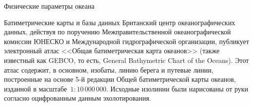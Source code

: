 \begin{chapter}{Физические параметры океана}
\begin{section}{Батиметрические карты и базы данных}
Британский центр океанографических данных, 
действуя по поручению Межправительственной океанографической комиссии ЮНЕСКО
и Международной гидрографической организации,
публикует электронный атлас <<Общая батиметрическая карта океанов>> 
(также известный как GEBCO, то есть, General Bathymetric Chart of the
Oceans). Этот атлас содержит, в основном, изобаты, линию берега 
и путевые линии, построенные на основе 5-й редакции Общей батиметрической 
карты океанов, изданной в масштабе~$1:10\,000\,000$.
Исходные изолинии были нарисованы от руки согласно оцифрованным данным 
эхолотирования.
%


\end{section}
\end{chapter}

